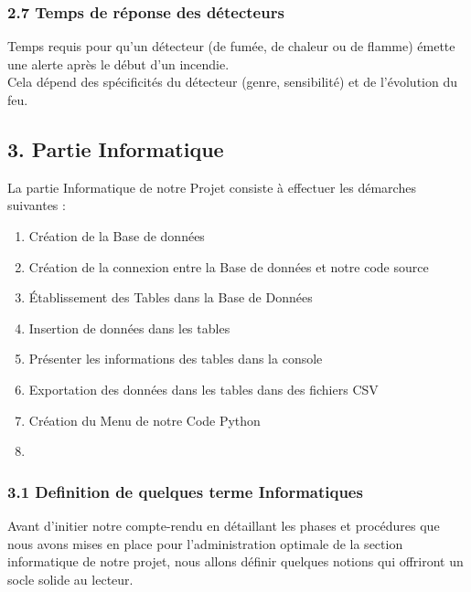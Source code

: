 \documentclass[
]{article}
\providecommand{\tightlist}{%
  \setlength{\itemsep}{0pt}\setlength{\parskip}{0pt}}
\begin{document}
\subsubsection{2.7 Temps de réponse des
détecteurs}\label{temps-de-ruxe9ponse-des-duxe9tecteurs}

Temps requis pour qu'un détecteur (de fumée, de chaleur ou de flamme)
émette une alerte après le début d'un incendie.\\
Cela dépend des spécificités du détecteur (genre, sensibilité) et de
l'évolution du feu.

\subsection{3. Partie Informatique}\label{partie-informatique}

La partie Informatique de notre Projet consiste à effectuer les
démarches suivantes :

\begin{enumerate}
\def\labelenumi{\arabic{enumi}.}
\tightlist
\item
  Création de la Base de données
\item
  Création de la connexion entre la Base de données et notre code source
\item
  Établissement des Tables dans la Base de Données
\item
  Insertion de données dans les tables
\item
  Présenter les informations des tables dans la console
\item
  Exportation des données dans les tables dans des fichiers CSV
\item
  Création du Menu de notre Code Python
\item
\end{enumerate}

\subsubsection{3.1 Definition de quelques terme
Informatiques}\label{definition-de-quelques-terme-informatiques}

Avant d'initier notre compte-rendu en détaillant les phases et
procédures que nous avons mises en place pour l'administration optimale
de la section informatique de notre projet, nous allons définir quelques
notions qui offriront un socle solide au lecteur.
\end{document}
